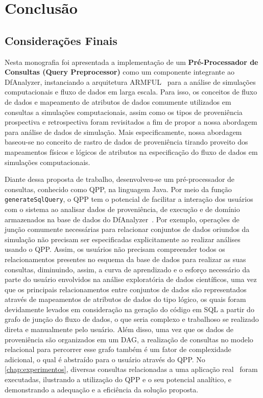 
\chapter{Conclusão}%
\label{chap:conclusao}

\section{Considerações Finais}

Nesta monografia foi apresentada a implementação de um \textbf{Pré-Processador de Consultas (Query Preprocessor)} como um componente integrante ao DfAnalyzer, instanciando a arquitetura ARMFUL~\cite{silva2017raw} para a análise de simulações computacionais e fluxo de dados em larga escala. Para isso, os conceitos de fluxo de dados e mapeamento de atributos de dados comumente utilizados em consultas a simulações computacionais, assim como os tipos de proveniência prospectiva e retrospectiva foram revisitados a fim de propor a nossa abordagem para análise de dados de simulação. Mais especificamente, nossa abordagem baseou-se no conceito de rastro de dados de proveniência tirando proveito dos mapeamentos físicos e lógicos de atributos na especificação do fluxo de dados em simulações computacionais. 

Diante dessa proposta de trabalho, desenvolveu-se um pré-processador de consultas, conhecido como QPP, na linguagem Java. Por meio da função \texttt{generateSqlQuery}, o QPP tem o potencial de facilitar a interação dos usuários com o sistema ao analisar dados de proveniência, de execução e de domínio armazenados na base de dados do DfAnalyzer~\cite{gadelha2012mtcprov}. Por exemplo, operações de junção comumente necessárias para relacionar conjuntos de dados oriundos da simulação não precisam ser especificadas explicitamente ao realizar análises usando o QPP. Assim, os usuários não precisam compreender todos os relacionamentos presentes no esquema da base de dados para realizar as suas consultas, diminuindo, assim, a curva de aprendizado e o esforço necessário da parte do usuário envolvidos na análise exploratória de dados científicos, uma vez que os principais relacionamentos entre conjuntos de dados são representados através de mapeamentos de atributos de dados do tipo lógico, os quais foram devidamente levados em consideração na geração do código em SQL a partir do grafo de junção do fluxo de dados, o que seria complexo e trabalhoso se realizado direta e manualmente pelo usuário.
Além disso, uma vez que os dados de proveniência são organizados em um DAG, a realização de consultas no modelo relacional para percorrer esse grafo também é um fator de complexidade adicional, o qual é abstraído para o usuário através do QPP.
No \autoref{chap:experimentos}, diversas consultas relacionadas a uma aplicação real~\cite{silva2016situ} foram executadas, ilustrando a utilização do QPP e o seu potencial analítico, e demonstrando a adequação e a eficiência da solução proposta.

